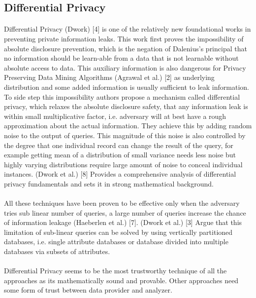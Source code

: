 \documentclass{report}
\begin{document}
\subsection{Differential Privacy}
\paragraph{}
Differential Privacy (Dwork) [4] is one of the relatively new foundational works in preventing private information leaks. This work first proves the impossibility of absolute disclosure prevention, which is the negation of Dalenius’s principal that no information should be learn-able from a data that is not learnable without absolute access to data. This auxiliary information is also dangerous for Privacy Preserving Data Mining Algorithms (Agrawal et al.) [2] as underlying distribution and some added information is usually sufficient to leak information.
To side step this impossibility authors propose a mechanism called differential privacy, which relaxes the absolute disclosure safety, that any information leak is within small multiplicative factor, i.e. adversary will at best have a rough approximation about the actual information. They achieve this by adding random noise to the output of queries. This magnitude of this noise is also controlled by the degree that one individual record can change the result of the query, for example getting mean of a distribution of small variance needs less noise but highly varying distributions require large amount of noise to conceal individual instances. (Dwork et al.) [8] Provides a comprehensive analysis of differential privacy fundamentals and sets it in strong mathematical background. 
\paragraph{}
All these techniques have been proven to be effective only when the adversary tries sub linear number of queries, a large number of queries increase the chance of information leakage (Haeberlen et al.) [7].
(Dwork et al.) [3] Argue that this limitation of sub-linear queries can be solved by using vertically partitioned databases, i.e. single attribute databases or database divided into multiple databases via subsets of attributes.
\paragraph{}
Differential Privacy seems to be the most trustworthy technique of all the approaches as its mathematically sound and provable. Other approaches need some form of trust between data provider and analyzer.
\end{document}

